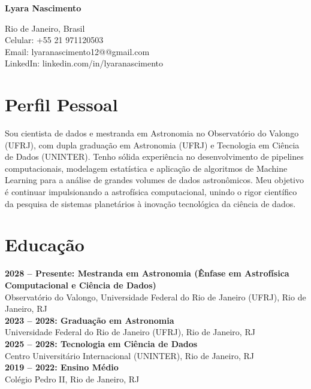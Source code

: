 \documentclass[11pt,a4paper]{article}
\begin{document}
{\Huge \textbf{\textcolor{titleblue}{Lyara Nascimento}}} \vspace{0.2em}

Rio de Janeiro, Brasil \\
Celular: +55 21 971120503 \\
Email: lyaranascimento12@@gmail.com \\
LinkedIn: linkedin.com/in/lyaranascimento \\

\vspace{0.4em}

\section*{Perfil Pessoal}
Sou cientista de dados e mestranda em Astronomia no Observatório do Valongo (UFRJ), com dupla graduação em Astronomia (UFRJ) e Tecnologia em Ciência de Dados (UNINTER). Tenho sólida experiência no desenvolvimento de pipelines computacionais, modelagem estatística e aplicação de algoritmos de Machine Learning para a análise de grandes volumes de dados astronômicos. Meu objetivo é continuar impulsionando a astrofísica computacional, unindo o rigor científico da pesquisa de sistemas planetários à inovação tecnológica da ciência de dados.

\section*{Educação}

\textbf{2028 -- Presente: Mestranda em Astronomia (Ênfase em Astrofísica Computacional e Ciência de Dados)}\\
Observatório do Valongo, Universidade Federal do Rio de Janeiro (UFRJ), Rio de Janeiro, RJ\\

\textbf{2023 -- 2028: Graduação em Astronomia}\\
Universidade Federal do Rio de Janeiro (UFRJ), Rio de Janeiro, RJ\\

\textbf{2025 -- 2028: Tecnologia em Ciência de Dados}\\
Centro Universitário Internacional (UNINTER), Rio de Janeiro, RJ\\

\textbf{2019 -- 2022: Ensino Médio}\\
Colégio Pedro II, Rio de Janeiro, RJ
\end{document}
